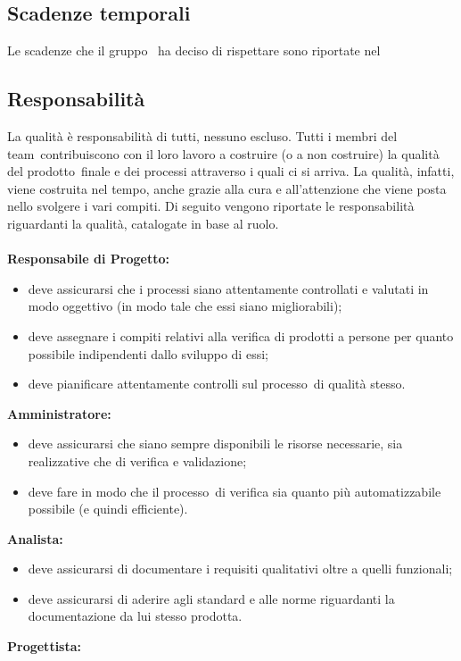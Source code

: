 \documentclass[../PianoDiQualifica.tex]{subfiles}
\begin{document}
	\subsection{Scadenze temporali}
	Le scadenze che il gruppo \leaf\ ha deciso di rispettare sono riportate nel \pianodiprogettov
	\subsection{Responsabilità}
		La qualità è responsabilità di tutti, nessuno escluso. Tutti i membri del team\g\ contribuiscono con il loro lavoro a costruire (o a non costruire) la qualità del prodotto\g\ finale e dei processi attraverso i quali ci si arriva. La qualità, infatti, viene costruita nel tempo, anche grazie alla cura e all'attenzione che viene posta nello svolgere i vari compiti.
		Di seguito vengono riportate le responsabilità riguardanti la qualità, catalogate in base al ruolo.
		\\\\\textbf{Responsabile di Progetto:}
			 \begin{itemize}
				\item deve assicurarsi che i processi siano attentamente controllati e valutati in modo oggettivo (in modo tale che essi siano migliorabili);
				\item deve assegnare i compiti relativi alla verifica di prodotti a persone per quanto possibile indipendenti dallo sviluppo di essi;
				\item deve pianificare attentamente controlli sul processo\g\ di qualità stesso.
			\end{itemize}
 			\textbf{Amministratore:}
			\begin{itemize}
				\item deve assicurarsi che siano sempre disponibili le risorse necessarie, sia realizzative che di verifica e validazione;
				\item deve fare in modo che il processo\g\ di verifica sia quanto più automatizzabile possibile (e quindi efficiente).
			\end{itemize}
			\textbf{Analista:}
			\begin{itemize}
				\item deve assicurarsi di documentare i requisiti qualitativi oltre a quelli funzionali;
				\item deve assicurarsi di aderire agli standard e alle norme riguardanti la documentazione da lui stesso prodotta.
			\end{itemize}
			\textbf{Progettista:}
\end{document}
